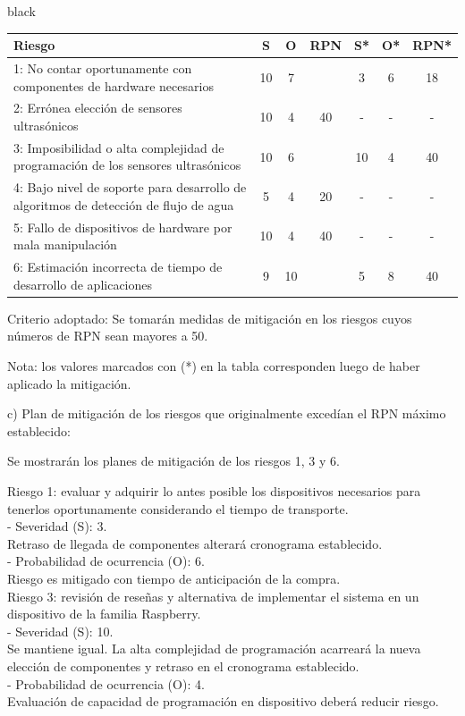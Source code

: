 \documentclass[
11pt, %
codirector, %
]{charter}
\begin{document}
\begin{consigna}{black}
\begin{table}[htpb]
\centering
\begin{tabularx}{\linewidth}{@{}|X|c|c|c|c|c|c|@{}}
\hline
\rowcolor[HTML]{C0C0C0} 
Riesgo & S & O & RPN &	 S* & O* & RPN* \\ \hline
1: No contar oportunamente con componentes de hardware necesarios   & 10  &  7 & \cellcolor{red}{70}  &  3  & 6   & 18     \\ \hline
2: Errónea elección de sensores ultrasónicos       & 10  &  4 & 40    &  -  &  -  &  -    \\ \hline
3: Imposibilidad o alta complejidad de programación de los sensores ultrasónicos       & 10  &  6 & \cellcolor{red}{60}  & 10   & 4   & 40     \\ \hline
4: Bajo nivel de soporte para desarrollo de algoritmos de detección de flujo de agua       &  5 & 4  & 20  & -   & -   & -     \\ \hline
5: Fallo de dispositivos de hardware por mala manipulación       & 10  & 4  & 40    & -   & -   & -     \\ \hline
6: Estimación incorrecta de tiempo de desarrollo de aplicaciones       &  9   & 10  & \cellcolor{red}{90}    & 5   & 8   & 40     \\ \hline
\end{tabularx}%
\end{table}

Criterio adoptado: 
Se tomarán medidas de mitigación en los riesgos cuyos números de RPN sean mayores a 50.

Nota: los valores marcados con (*) en la tabla corresponden luego de haber aplicado la mitigación.

c) Plan de mitigación de los riesgos que originalmente excedían el RPN máximo establecido:
 
Se mostrarán los planes de mitigación de los riesgos 1, 3 y 6. 
 
Riesgo 1: evaluar y adquirir lo antes posible los dispositivos necesarios para tenerlos oportunamente considerando el tiempo de transporte. \\
  - Severidad (S): 3. \\
	Retraso de llegada de componentes alterará cronograma establecido. \\
  - Probabilidad de ocurrencia (O): 6. \\
	Riesgo es mitigado con tiempo de anticipación de la compra. \\

Riesgo 3: revisión de reseñas y alternativa de implementar el sistema en un dispositivo de la familia Raspberry. \\
  - Severidad (S): 10. \\
	Se mantiene igual. La alta complejidad de programación acarreará la nueva elección de componentes y retraso en el cronograma establecido. \\
  - Probabilidad de ocurrencia (O): 4. \\
	Evaluación de capacidad de programación en dispositivo deberá reducir riesgo. \\


\end{consigna}
\end{document}
